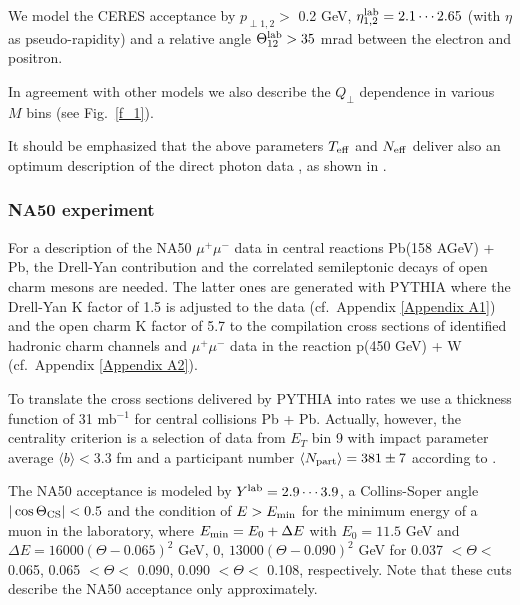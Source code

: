We model the CERES acceptance by $p_{\perp 1,2} >$ 0.2 GeV,
$\eta_{1,2}^{\rm lab} = 2.1 \cdots 2.65$ (with $\eta$ as
pseudo-rapidity) and a relative angle
$\Theta^{\rm lab}_{12} > 35$ mrad between the electron and positron.

In agreement with other models \cite{RappWambach_new,V.Koch}
we also describe the $Q_\perp$ dependence in various $M$ bins
(see Fig.~\ref{f_1}). 

It should be emphasized that
the above parameters $T_{\rm eff}$ and $N_{\rm eff}$ deliver also 
an optimum description of 
the direct photon data \cite{WA98}, as shown in \cite{our_photons}.

\subsubsection{NA50 experiment}

For a description of the NA50 $\mu^+ \mu^-$ data \cite{NA50} 
in central reactions Pb(158 AGeV) + Pb, the Drell-Yan contribution 
and the correlated semileptonic decays of open charm mesons 
are needed.
The latter ones are generated with PYTHIA \cite{PYTHIA}
where the Drell-Yan
K factor of 1.5 is adjusted to the data \cite{DY_K_factor,DY_K_factor_2} 
(cf.\ Appendix \ref{Appendix A1}) and
the open charm K factor of 5.7 to the compilation cross sections
of identified hadronic charm channels \cite{PBM}
and $\mu^+ \mu^-$ data in the reaction
p(450 GeV) + W \cite{pW_Capelli} (cf.\ Appendix \ref{Appendix A2}).

To translate the cross sections delivered by PYTHIA 
into rates we use a thickness function of 31 mb${}^{-1}$
for central collisions Pb + Pb. Actually, however, the centrality criterion
is a selection of data from $E_T$ bin 9 with impact parameter
average $\langle b \rangle < 3.3$ fm and a participant number
$\langle N_{\rm part} \rangle = 381 \pm 7$ according to \cite{NA50}.

The NA50 acceptance is modeled by
$Y^{\rm lab} = 2.9 \cdots 3.9$, a Collins-Soper angle
$\vert \cos \Theta_{\rm CS} \vert < 0.5$ and
the condition of $E > E_{\rm min}$ for the minimum energy of a muon in the
laboratory, where
$E_{\rm min} = E_0 + \Delta E$ with
$E_0 = 11.5$ GeV and
$\Delta E = 16000 (\Theta - 0.065)^2$ GeV,
$0$,
$13000 (\Theta - 0.090)^2$ GeV for
0.037 $< \Theta <$ 0.065,
0.065 $< \Theta <$ 0.090,
0.090 $< \Theta <$ 0.108, respectively. Note that these cuts describe
the NA50 acceptance only approximately.

